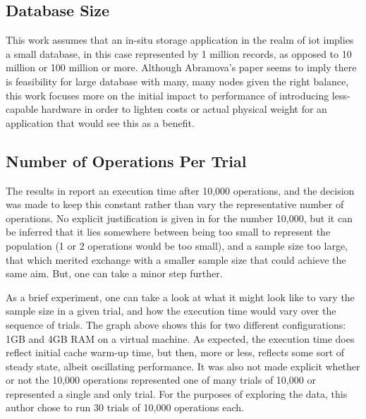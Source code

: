 \subsection{Database Size}

This work assumes that an in-situ storage application in the realm of \gls{iot} implies a small database, in this case represented by 1 million records, as opposed to 10 million or 100 million or more.  Although Abramova’s paper seems to imply there is feasibility for large database with many, many nodes given the right balance, this work focuses more on the initial impact to performance of introducing less-capable hardware in order to lighten costs or actual physical weight for an application that would see this as a benefit.

\subsection{Number of Operations Per Trial}

The results in \cite{Abramova2014} report an execution time after 10,000 operations, and the decision was made to keep this constant rather than vary the representative number of operations.  No explicit justification is given in \cite{Abramova2014} for the number 10,000, but it can be inferred that it lies somewhere between being too small to represent the population (1 or 2 operations would be too small), and a sample size too large, that which merited exchange with a smaller sample size that could achieve the same aim.  But, one can take a minor step further.

As a brief experiment, one can take a look at what it might look like to vary the sample size in a given trial, and how the execution time would vary over the sequence of trials.  The graph above shows this for two different configurations: 1GB and 4GB RAM on a virtual machine.  As expected, the execution time does reflect initial cache warm-up time, but then, more or less, reflects some sort of steady state, albeit oscillating performance.
It was also not made explicit whether or not the 10,000 operations represented one of many trials of 10,000 or represented a single and only trial.  For the purposes of exploring the data, this author chose to run 30 trials of 10,000 operations each.

